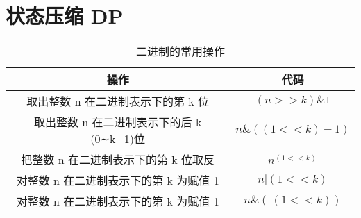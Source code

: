 \section{状态压缩 DP}
\begin{table}[h]
\centering
\begin{tabular}{|c|c|}
\hline 操作 & 代码 \\
\hline 取出整数 n 在二进制表示下的第 k 位 & $(n >> k) \& 1$ \\
\hline 取出整数 n 在二进制表示下的后 k (0∼k−1)位 & $n \& ((1 << k) - 1)$ \\
\hline 把整数 n 在二进制表示下的第 k 位取反 & $n ^ (1 << k)$ \\
\hline 对整数 n 在二进制表示下的第 k 为赋值 1 & $n|(1<<k)$ \\
\hline 对整数 n 在二进制表示下的第 k 为赋值 1 & $n \& (~(1 << k))$\\
\hline
\end{tabular}
\caption{二进制的常用操作}
\label{tab:Margin_settings}
\end{table}